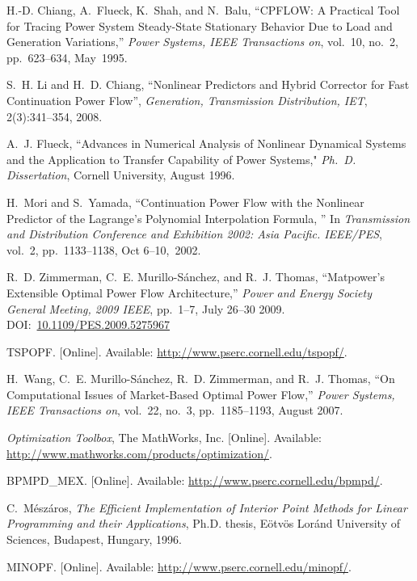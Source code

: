 \documentclass[12pt]{article}
\newcommand{\matpower}[0]{{\sc Matpower}}
\numberwithin{equation}{section}
\numberwithin{table}{section}
\numberwithin{figure}{section}
\begin{document}
\begin{thebibliography}{99}
H.-D. Chiang, A.~Flueck, K.~Shah, and N.~Balu, ``CPFLOW:  A Practical Tool for Tracing Power System Steady-State Stationary Behavior Due to Load and Generation Variations,'' \emph{Power Systems, IEEE Transactions on}, vol.~10, no.~2, pp.~623--634, May~1995.

S.~H. Li and H.~D. Chiang, ``Nonlinear Predictors and Hybrid Corrector for Fast Continuation Power Flow'', {\em Generation, Transmission Distribution, IET}, 2(3):341--354, 2008.

A.~J. Flueck, ``Advances in Numerical Analysis of Nonlinear Dynamical Systems and the Application to Transfer Capability of Power Systems," \emph{Ph.~D. Dissertation}, Cornell University, August 1996.

H.~Mori and S.~Yamada, ``Continuation Power Flow with the Nonlinear Predictor of the Lagrange's Polynomial Interpolation Formula, '' In {\em Transmission and Distribution Conference and Exhibition 2002:
  Asia Pacific. IEEE/PES}, vol.~2, pp.~1133--1138, Oct 6--10,~2002.

R.~D. Zimmerman, C.~E. Murillo-S{\'a}nchez, and R.~J. Thomas, ``\matpower{}'s
  Extensible Optimal Power Flow Architecture,'' \emph{Power and Energy Society
  General Meeting, 2009 IEEE}, pp.~1--7, July 26--30 2009.
  DOI:~\href{https://doi.org/10.1109/PES.2009.5275967}{10.1109/PES.2009.5275967}

TSPOPF. [Online]. Available: \url{http://www.pserc.cornell.edu/tspopf/}.

H.~Wang, C.~E. Murillo-S{\'a}nchez, R.~D. Zimmerman, and R.~J. Thomas, ``On
  Computational Issues of Market-Based Optimal Power Flow,'' \emph{Power
  Systems, IEEE Transactions on}, vol.~22, no.~3, pp.~1185--1193, August 2007.

\emph{Optimization Toolbox}, The MathWorks, Inc.
  [Online]. Available: \url{http://www.mathworks.com/products/optimization/}.

BPMPD\_MEX. [Online]. Available:
  \url{http://www.pserc.cornell.edu/bpmpd/}.

C.~M{\'e}sz{\'a}ros, \emph{The Efficient Implementation of Interior Point Methods for Linear Programming and their Applications}, Ph.D. thesis,
  E{\"o}tv{\"o}s Lor{\'a}nd University of Sciences, Budapest, Hungary, 1996.

MINOPF. [Online]. Available:
  \url{http://www.pserc.cornell.edu/minopf/}.


\end{thebibliography}
\end{document}
